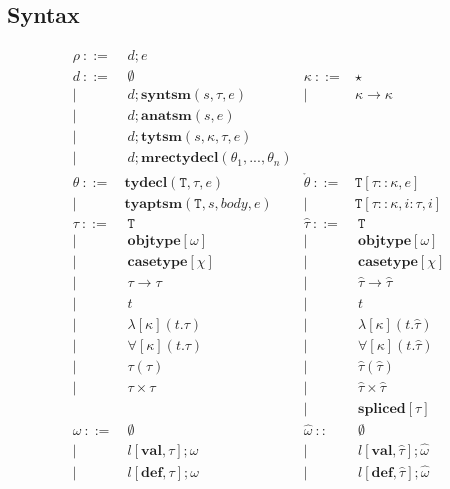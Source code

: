 \documentclass[letterpaper, notitlepage]{article}
\newcommand{\T}{\mathtt{T}}
\begin{document}
\subsection{Syntax}
\[
\begin{array}{rlrlrl}
	\rho		~::=&~ {d};e\\				
	{d}		~::=&~ \emptyset									& \kappa      ~::=& \star\\
				| ~	&~ {d}; \mathbf{syntsm}(s,\tau,e)			&		| ~ & \kappa\rightarrow\kappa\\
				| ~	&~ {d}; \mathbf{anatsm}(s,e)				\\
				| ~	&~ {d};\mathbf{tytsm}(s,\kappa,\tau,e)				\\
				| ~ &~{d};\mathbf{mrectydecl}(\theta_1,...,\theta_n)\\
	\theta 	~::=&\mathbf{tydecl}(\T,\tau,e)				&\mathring\theta~::=&\T[\tau::\kappa,e]\\
			|~&\mathbf{tyaptsm}(\T,s,body,e)			&|~&\T[\tau::\kappa,i:\tau,i]\\
	\tau 		~::=&~ \T				&\hat{\tau} ~::=&~ \T\\
				|~	& ~ \mathbf{objtype}[\omega]		&|~ &~ \mathbf{objtype}[\omega]				\\
				|~	& ~ \mathbf{casetype}[\chi]			&|~ &~ \mathbf{casetype}[\chi] 				\\
				|~ 	& ~ \tau\rightarrow\tau				&|~ &~ \hat\tau\rightarrow\hat\tau 	\\
				|~ 	& ~ t								&|~ &~ t 									\\
				|~ 	& ~ \lambda[\kappa](t.\tau)			&|~ &~ \lambda[\kappa](t.\hat{\tau})\\
				|~  & ~ \forall[\kappa](t.\tau) 			&|~ &~ \forall[\kappa](t.\hat{\tau})\\
				|~ 	& ~ \tau(\tau)						&|~ &~ \hat{\tau}(\hat{\tau})\\
				|~ 	& ~ \tau \times \tau 				&|~ &~ \hat{\tau}\times\hat{\tau}\\
				   	&									&|~ &~ \mathbf{spliced}[\tau]\\
	\omega ~::=&~ 	\emptyset							&\hat{\omega} ~::&~ \emptyset\\
	 |~&  	~l[\mathbf{val}, \tau];\omega				&|~ & ~l[\mathbf{val}, \hat\tau];\hat\omega \\
	 |~&	~l[\mathbf{def}, \tau];\omega				&|~ & ~l[\mathbf{def}, \hat\tau];\hat\omega\\

\end{array}\]
\end{document}
